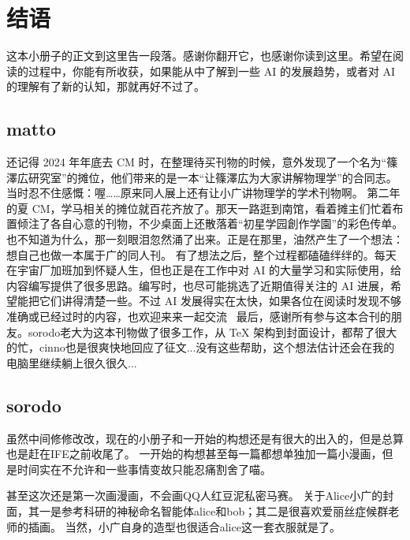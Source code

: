 \backmatter

\begingroup
\titlespacing*{\chapter}{0pt}{-24pt}{18pt}
\chapter*{结语}
{}

\noindent
这本小册子的正文到这里告一段落。感谢你翻开它，也感谢你读到这里。希望在阅读的过程中，你能有所收获，如果能从中了解到一些 AI 的发展趋势，或者对 AI 的理解有了新的认知，那就再好不过了。

\section*{matto}

还记得 2024 年年底去 CM 时，在整理待买刊物的时候，意外发现了一个名为“篠澤広研究室”的摊位，他们带来的是一本“让篠澤広为大家讲解物理学”的合同志。当时忍不住感慨：喔……原来同人展上还有让小广讲物理学的学术刊物啊。
第二年的夏 CM，学马相关的摊位就百花齐放了。那天一路逛到南馆，看着摊主们忙着布置倾注了各自心意的刊物，不少桌面上还散落着“初星学园創作学園”的彩色传单。也不知道为什么，那一刻眼泪忽然涌了出来。正是在那里，油然产生了一个想法：想自己也做一本属于广的同人刊。
有了想法之后，整个过程都磕磕绊绊的。每天在宇宙厂加班加到怀疑人生，但也正是在工作中对 AI 的大量学习和实际使用，给内容编写提供了很多思路。编写时，也尽可能挑选了近期值得关注的 AI 进展，希望能把它们讲得清楚一些。不过 AI 发展得实在太快，如果各位在阅读时发现不够准确或已经过时的内容，也欢迎来来一起交流~
最后，感谢所有参与这本合刊的朋友。sorodo老大为这本刊物做了很多工作，从 TeX 架构到封面设计，都帮了很大的忙，cinno也是很爽快地回应了征文...没有这些帮助，这个想法估计还会在我的电脑里继续躺上很久很久...


\section*{sorodo}

虽然中间修修改改，现在的小册子和一开始的构想还是有很大的出入的，但是总算也是赶在IFE之前收尾了。
一开始的构想甚至每一篇都想单独加一篇小漫画，但是时间实在不允许和一些事情变故只能忍痛割舍了喵。

甚至这次还是第一次画漫画，不会画QQ人红豆泥私密马赛。
关于Alice小广的封面，其一是参考科研的神秘命名智能体alice和bob；其二是很喜欢爱丽丝症候群老师的插画。
当然，小广自身的造型也很适合alice这一套衣服就是了。


